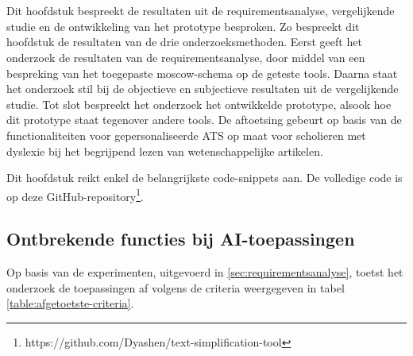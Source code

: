 \chapter{}%
\label{ch:resultaten}

Dit hoofdstuk bespreekt de resultaten uit de requirementsanalyse, vergelijkende studie en de ontwikkeling van het prototype besproken. Zo bespreekt dit hoofdstuk de resultaten van de drie onderzoeksmethoden. Eerst geeft het onderzoek de resultaten van de requirementsanalyse, door middel van een bespreking van het toegepaste moscow-schema op de geteste tools. Daarna staat het onderzoek stil bij de objectieve en subjectieve resultaten uit de vergelijkende studie. Tot slot bespreekt het onderzoek het ontwikkelde prototype, alsook hoe dit prototype staat tegenover andere tools. De aftoetsing gebeurt op basis van de functionaliteiten voor gepersonaliseerde ATS op maat voor scholieren met dyslexie bij het begrijpend lezen van wetenschappelijke artikelen. 

Dit hoofdstuk reikt enkel de belangrijkste code-snippets aan. De volledige code is op deze GitHub-repository\footnote{https://github.com/Dyashen/text-simplification-tool}.

\section{Ontbrekende functies bij AI-toepassingen}

Op basis van de experimenten, uitgevoerd in \ref{sec:requirementsanalyse}, toetst het onderzoek de toepassingen af volgens de criteria weergegeven in tabel \ref{table:afgetoetste-criteria}.

